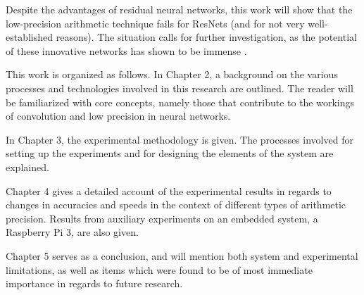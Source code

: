 Despite the advantages of residual neural networks, this work will show that the low-precision arithmetic technique fails for ResNets (and for not very well-established reasons). The situation calls for further investigation, as the potential of these innovative networks has shown to be immense \cite{resnets1}.

This work is organized as follows. In Chapter 2, a background on the various processes and technologies involved in this research are outlined. The reader will be familiarized with core concepts, namely those that contribute to the workings of convolution and low precision in neural networks. 

In Chapter 3, the experimental methodology is given. The processes involved for setting up the experiments and for designing the elements of the system are explained.

Chapter 4 gives a detailed account of the experimental results in regards to changes in accuracies and speeds in the context of different types of arithmetic precision. Results from auxiliary experiments on an embedded system, a Raspberry Pi 3, are also given.

Chapter 5 serves as a conclusion, and will mention both system and experimental limitations, as well as items which were found to be of most immediate importance in regards to future research.